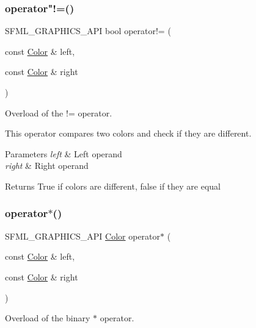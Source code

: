 \subsubsection{\texorpdfstring{operator"!=()}{operator!=()}}
{\footnotesize\ttfamily S\+F\+M\+L\+\_\+\+G\+R\+A\+P\+H\+I\+C\+S\+\_\+\+A\+PI bool operator!= (\begin{DoxyParamCaption}\item[{const \hyperlink{classsf_1_1_color}{Color} \&}]{left,  }\item[{const \hyperlink{classsf_1_1_color}{Color} \&}]{right }\end{DoxyParamCaption})\hspace{0.3cm}{\ttfamily [related]}}



Overload of the != operator. 

This operator compares two colors and check if they are different.


\begin{DoxyParams}{Parameters}
{\em left} & Left operand \\
\hline
{\em right} & Right operand\\
\hline
\end{DoxyParams}
\begin{DoxyReturn}{Returns}
True if colors are different, false if they are equal 
\end{DoxyReturn}
\mbox{\label{classsf_1_1_color_aa9de267d831b4ec8ba65b627e51d50c3}} 
\subsubsection{\texorpdfstring{operator$\ast$()}{operator*()}}
{\footnotesize\ttfamily S\+F\+M\+L\+\_\+\+G\+R\+A\+P\+H\+I\+C\+S\+\_\+\+A\+PI \hyperlink{classsf_1_1_color}{Color} operator$\ast$ (\begin{DoxyParamCaption}\item[{const \hyperlink{classsf_1_1_color}{Color} \&}]{left,  }\item[{const \hyperlink{classsf_1_1_color}{Color} \&}]{right }\end{DoxyParamCaption})\hspace{0.3cm}{\ttfamily [related]}}



Overload of the binary $\ast$ operator. 

